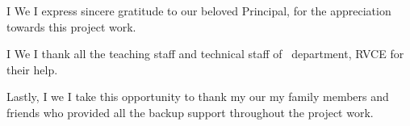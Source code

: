 \ifPG I \else \ifStuNameBUsed We \else I \fi\fi express sincere gratitude to our beloved Principal, \textbf{\printPrincipal} for the appreciation towards this project work.\\ \par

\ifPG I \else\ifStuNameBUsed We \else I \fi\fi thank all the teaching staff and technical staff of \printDepartmentLF\, department, RVCE for their help.\\ \par 

Lastly, \ifPG I \else\ifStuNameBUsed we \else I \fi\fi take this opportunity to thank \ifPG my \else\ifStuNameBUsed our \else my \fi\fi family members and friends who provided all the backup support throughout the project work.\\ \par

